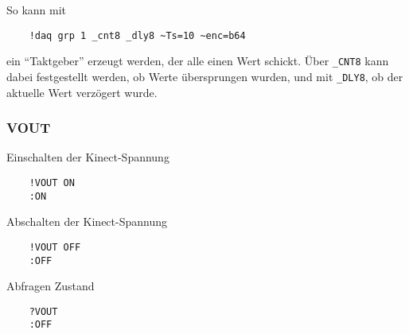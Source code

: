 So kann mit
\begin{verbatim}
	!daq grp 1 _cnt8 _dly8 ~Ts=10 ~enc=b64
\end{verbatim}
ein "`Taktgeber"' erzeugt werden, der alle  einen Wert schickt. Über \verb|_CNT8| kann dabei festgestellt werden, ob Werte übersprungen wurden, und mit \verb|_DLY8|, ob der aktuelle Wert verzögert wurde.



\subsubsection{VOUT}

Einschalten der Kinect-Spannung
\begin{verbatim}
	!VOUT ON
	:ON
\end{verbatim}

Abschalten der Kinect-Spannung
\begin{verbatim}
	!VOUT OFF
	:OFF
\end{verbatim}


Abfragen Zustand
\begin{verbatim}
	?VOUT
	:OFF
\end{verbatim}










